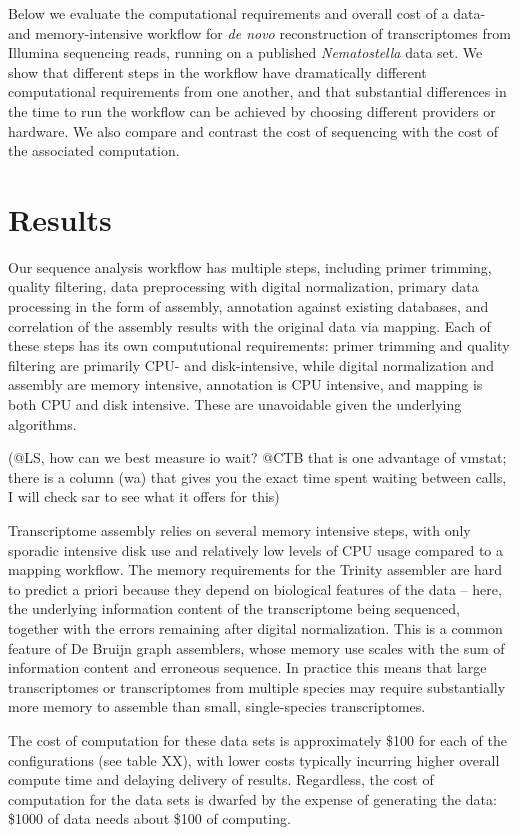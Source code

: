 \documentclass[11pt]{article}
\begin{document}
Below we evaluate the computational requirements and overall cost of a
data- and memory-intensive workflow for {\em de novo} reconstruction
of transcriptomes from Illumina sequencing reads, running on a
published {\em Nematostella} data set.  We show that different steps
in the workflow have dramatically different computational requirements
from one another, and that substantial differences in the time to run
the workflow can be achieved by choosing different providers or hardware.
We also compare and contrast the cost of sequencing with the cost of the
associated computation.


\section*{Results}

Our sequence analysis workflow has multiple steps, including primer
trimming, quality filtering, data preprocessing with digital
normalization, primary data processing in the form of assembly,
annotation against existing databases, and correlation of the assembly
results with the original data via mapping.  Each of these steps has
its own compututional requirements: primer trimming and quality
filtering are primarily CPU- and disk-intensive, while digital
normalization and assembly are memory intensive, annotation is CPU
intensive, and mapping is both CPU and disk intensive.  These are
unavoidable given the underlying algorithms.

(@LS, how can we best measure io wait?
@CTB that is one advantage of vmstat; there is a column (wa) that gives you 
the exact time spent waiting between calls, I will check sar to see what it
offers for this)

Transcriptome assembly relies on several memory intensive steps, with
only sporadic intensive disk use and relatively low levels of CPU
usage compared to a mapping workflow.  The memory requirements for the
Trinity assembler are hard to predict a priori because they depend on
biological features of the data -- here, the underlying information
content of the transcriptome being sequenced, together with the errors
remaining after digital normalization.  This is a common feature of De
Bruijn graph assemblers, whose memory use scales with the sum of
information content and erroneous sequence.  In practice this means
that large transcriptomes or transcriptomes from multiple species may
require substantially more memory to assemble than small,
single-species transcriptomes.

The cost of computation for these data sets is approximately \$100 for
each of the configurations (see table XX), with lower costs typically
incurring higher overall compute time and delaying delivery of results.
Regardless, the cost of computation for the data sets is dwarfed by
the expense of generating the data: \$1000 of data needs about \$100
of computing.
\end{document}
